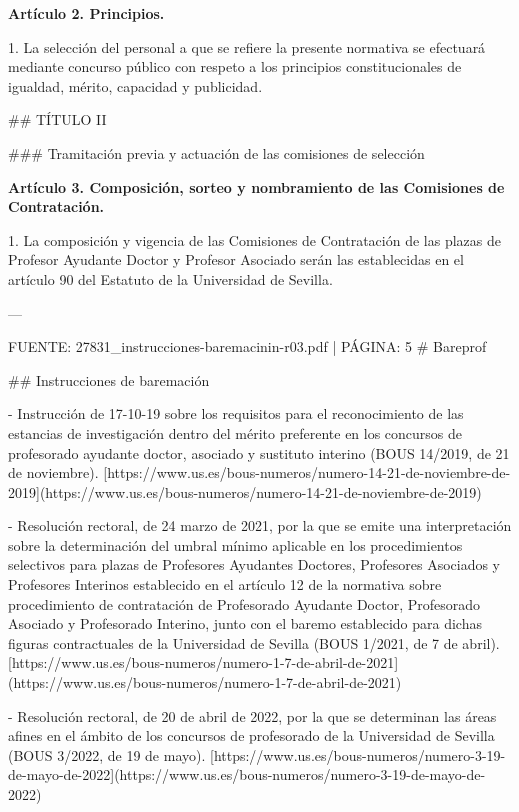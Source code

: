 \documentclass{article}
\begin{document}
\begin{itemize}
\begin{itemize}
\begin{scriptsize}
                  \textbf{Artículo 2. Principios.}

                  1. La selección del personal a que se refiere la presente normativa se efectuará mediante concurso público con respeto a los principios constitucionales de igualdad, mérito, capacidad y publicidad.

                  \#\# TÍTULO II

                  \#\#\# Tramitación previa y actuación de las comisiones de selección

                  \textbf{Artículo 3. Composición, sorteo y nombramiento de las Comisiones de Contratación.}

                  1. La composición y vigencia de las Comisiones de Contratación de las plazas de Profesor Ayudante Doctor y Profesor Asociado serán las establecidas en el artículo 90 del Estatuto de la Universidad de Sevilla.

                  ---

                  FUENTE: 27831\_instrucciones-baremacinin-r03.pdf | PÁGINA: 5
                  \# Bareprof

                  \#\# Instrucciones de baremación

                  - Instrucción de 17-10-19 sobre los requisitos para el reconocimiento de las estancias de investigación dentro del mérito preferente en los concursos de profesorado ayudante doctor, asociado y sustituto interino (BOUS 14/2019, de 21 de noviembre).
                    [https://www.us.es/bous-numeros/numero-14-21-de-noviembre-de-2019](https://www.us.es/bous-numeros/numero-14-21-de-noviembre-de-2019)

                  - Resolución rectoral, de 24 marzo de 2021, por la que se emite una interpretación sobre la determinación del umbral mínimo aplicable en los procedimientos selectivos para plazas de Profesores Ayudantes Doctores, Profesores Asociados y Profesores Interinos establecido en el artículo 12 de la normativa sobre procedimiento de contratación de Profesorado Ayudante Doctor, Profesorado Asociado y Profesorado Interino, junto con el baremo establecido para dichas figuras contractuales de la Universidad de Sevilla (BOUS 1/2021, de 7 de abril).
                    [https://www.us.es/bous-numeros/numero-1-7-de-abril-de-2021](https://www.us.es/bous-numeros/numero-1-7-de-abril-de-2021)

                  - Resolución rectoral, de 20 de abril de 2022, por la que se determinan las áreas afines en el ámbito de los concursos de profesorado de la Universidad de Sevilla (BOUS 3/2022, de 19 de mayo).
                    [https://www.us.es/bous-numeros/numero-3-19-de-mayo-de-2022](https://www.us.es/bous-numeros/numero-3-19-de-mayo-de-2022)


\end{scriptsize}
\end{itemize}
\end{itemize}
\end{document}
